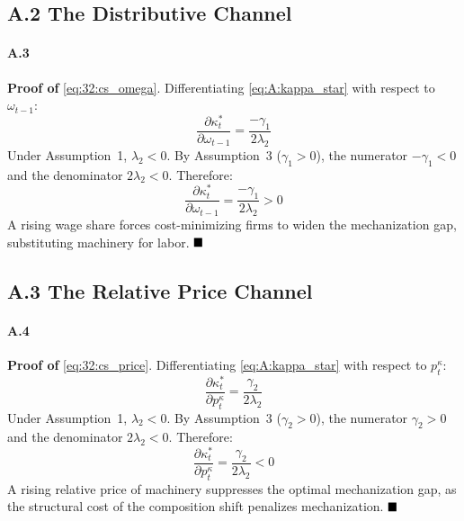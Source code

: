 \subsection*{A.2 The Distributive Channel}

\paragraph{A.3}
\textbf{Proof of} \eqref{eq:32:cs_omega}. Differentiating
\eqref{eq:A:kappa_star} with respect to $\omega_{t-1}$:
\begin{equation}
	\frac{\partial \kappa_t^*}{\partial \omega_{t-1}}
	= \frac{-\gamma_1}{2\lambda_2}
	\label{eq:A:cs_omega}
\end{equation}
Under Assumption~1, $\lambda_2 < 0$. By Assumption~3
($\gamma_1 > 0$), the numerator $-\gamma_1 < 0$ and the
denominator $2\lambda_2 < 0$. Therefore:
\begin{equation}
	\frac{\partial \kappa_t^*}{\partial \omega_{t-1}}
	= \frac{-\gamma_1}{2\lambda_2} > 0
	\label{eq:A:cs_omega_sign}
\end{equation}
A rising wage share forces cost-minimizing firms to widen
the mechanization gap, substituting machinery for labor.
$\hfill\blacksquare$

\subsection*{A.3 The Relative Price Channel}

\paragraph{A.4}
\textbf{Proof of} \eqref{eq:32:cs_price}. Differentiating
\eqref{eq:A:kappa_star} with respect to $p^\kappa_t$:
\begin{equation}
	\frac{\partial \kappa_t^*}{\partial p^\kappa_t}
	= \frac{\gamma_2}{2\lambda_2}
	\label{eq:A:cs_price}
\end{equation}
Under Assumption~1, $\lambda_2 < 0$. By Assumption~3
($\gamma_2 > 0$), the numerator $\gamma_2 > 0$ and the
denominator $2\lambda_2 < 0$. Therefore:
\begin{equation}
	\frac{\partial \kappa_t^*}{\partial p^\kappa_t}
	= \frac{\gamma_2}{2\lambda_2} < 0
	\label{eq:A:cs_price_sign}
\end{equation}
A rising relative price of machinery suppresses the optimal
mechanization gap, as the structural cost of the composition
shift penalizes mechanization. $\hfill\blacksquare$

